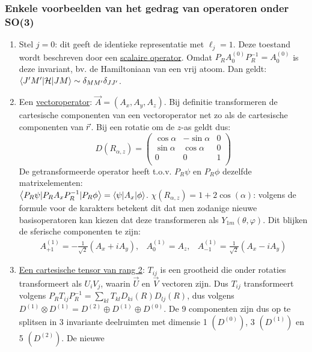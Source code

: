 \subsubsection{Enkele voorbeelden van het gedrag van operatoren onder SO(3)}
\begin{enumerate}
\item Stel $j=0$: dit geeft de identieke representatie met $\ell_j=1$. Deze
      toestand wordt beschreven door een \underline{scalaire operator}. Omdat
      $P_RA^{(0)}_0P_R^{-1}=A_0^{(0)}$ is deze invariant, bv. de Hamiltoniaan
      van een vrij atoom. Dan geldt: $\left\langle J'M'|{\cal{H}}|JM \right\rangle\sim\delta_{MM'}\delta_{JJ'}$.
\item Een \underline{vectoroperator}: $\vec{A}=(A_x,A_y,A_z)$. Bij definitie transformeren
      de cartesische componenten van een vectoroperator net zo als de
      cartesische componenten van $\vec{r}$. Bij een rotatie om de $z$-as geldt
      dus:
      \[
      D(R_{\alpha,z})=\left(\begin{array}{ccc}
                      \cos\alpha&-\sin\alpha&0\\
                      \sin\alpha& \cos\alpha&0\\
                      0&0&1\\
                      \end{array}\right)
      \]
      De getransformeerde operator heeft t.o.v. $P_R\psi$ en $P_R\phi$ dezelfde
      matrixelementen:\\
      $\left\langle P_R\psi|P_RA_xP_R^{-1}|P_R\phi \right\rangle=\left\langle \psi|A_x|\phi \right\rangle$.
      $\chi(R_{\alpha,z})=1+2\cos(\alpha)$: volgens de formule voor de karakters
      betekent dit dat men zodanige nieuwe basisoperatoren kan kiezen
      dat deze transformeren als $Y_{1m}(\theta,\varphi)$. Dit blijken de
      sferische componenten te zijn:
      \begin{eqnarray*}
      A^{(1)}_{+1}=-\frac{1}{\sqrt{2}}(A_x+iA_y),&A^{(1)}_0=A_z,&A^{(1)}_{-1}=\frac{1}{\sqrt{2}}(A_x-iA_y)
      \end{eqnarray*}
\item \underline{Een cartesische tensor van rang 2}: $T_{ij}$ is een grootheid
      die onder rotaties transformeert als $U_iV_j$, waarin $\vec{U}$ en $\vec{V}$
      vectoren zijn. Dus $T_{ij}$ transformeert volgens
      $P_RT_{ij}P_R^{-1}=\sum\limits_{kl}T_{kl}D_{ki}(R)D_{lj}(R)$, dus volgens
      $D^{(1)}\otimes D^{(1)}= D^{(2)}\oplus D^{(1)}\oplus D^{(0)}$.
      De 9 componenten zijn dus op te splitsen in 3 invariante deelruimten met
      dimensie 1 $(D^{(0)})$, 3 $(D^{(1)})$ en 5 $(D^{(2)})$. De nieuwe

\end{enumerate}
